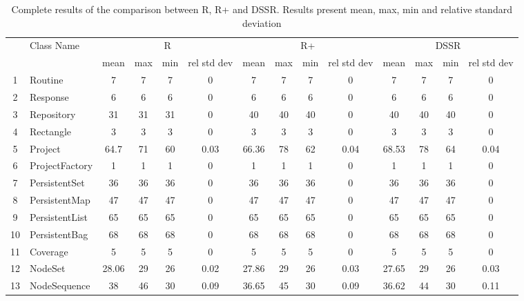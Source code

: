 \documentclass[conference]{IEEEtran}
\begin{document}
\begin{table} [ht!] {
  \scriptsize
 \caption{Complete results of the comparison between R, R+ and DSSR. Results present mean, max, min and relative standard deviation}
    \begin{tabular}{c l c c c c c c c c c c c c}
      \multirow{2}{*}{}		& \multirow{2}{*}{Class Name}		& \multicolumn{4}{c}{R}							&	\multicolumn{4}{c}{R+}							&	\multicolumn{4}{c}{DSSR}	\\
      						&							& mean & max & min & rel std dev				& mean 	& max 	& min 	& rel std dev 		& mean 		& 	max 		&	 min 		& rel std dev \\
     
 1						& Routine						& 7	&	7	&	7	& 		0					& 7		&  7		& 7		& 		0			& 7			& 7			& 7			&	0	\\
 2						& Response					& 6	&	6	&	6	& 		0					& 6		&  6		& 6		& 		0			& 6			& 6			& 6			&	0	\\
 3						& Repository					& 31	&	31	&	31	& 		0					& 40		&  40		& 40		& 		0			& 40			& 40			& 40			&	0	\\      
 4						& Rectangle					& 3	&	3	&	3	& 		0					& 3		&  3 		& 3		& 		0			& 3			& 3			& 3			&	0	\\      
 5						& Project						& 64.7&	71	&	60	& 		0.03					& 66.36	&  78		& 62		& 		0.04			& 68.53		& 78			& 64			&	0.04	\\      
 6						& ProjectFactory				& 1	&	1	&	1	& 		0					& 1		&  1		& 1		& 		0			& 1			& 1			& 1			&	0	\\      
 7						& PersistentSet					& 36	&	36	&	36	& 		0					& 36		&  36		& 36		& 		0			& 36			& 36			& 36 			&	0	\\      
 8						& PersistentMap				& 47	&	47	&	47	& 		0					& 47		&  47		& 47		& 		0			& 47			& 47			& 47			&	0	\\      
 9						& PersistentList					& 65	&	65	&	65	& 		0					& 65		&  65		& 65		& 		0			& 65			& 65			& 65			&	0	\\      
 10						& PersistentBag				& 68	&	68	&	68	& 		0					& 68		&  68		& 68		& 		0			& 68			& 68			& 68			&	0	\\      
 11						& Coverage					& 5	&	5	&	5	& 		0					& 5		& 5		& 5		& 		0			& 5			& 5			& 5			&	0	\\      
 12						& NodeSet					& 28.06&	29	&	26	& 		0.02					& 27.86	& 29 		& 26		& 		0.03			& 27.65		& 29			& 26			&	0.03	\\      
 13						& NodeSequence				& 38	&	46	&	30	& 		0.09					& 36.65	& 45 		& 30		& 		0.09			& 36.62		& 44			& 30			&	0.11	\\      

\end{tabular}}
\end{table}
\end{document}
